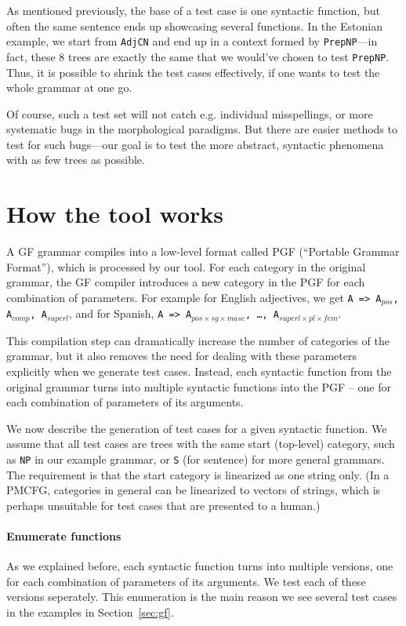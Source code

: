 \documentclass[11pt]{article}
\def\t#1{\texttt{#1}}
\begin{document}
As mentioned previously, the base of a test case is one syntactic
function, but often the same sentence ends up showcasing several
functions. In the Estonian example, we start from \t{AdjCN} 
and end up in a context formed by \t{PrepNP}---in fact, these 8 trees
are exactly the same that we would've chosen to test \t{PrepNP}. Thus,
it is possible to shrink the test cases effectively, if one wants to
test the whole grammar at one go.

Of course, such a test set will not catch e.g. individual
misspellings, or more systematic bugs in the morphological
paradigms. But there are easier methods to test for such bugs---our 
goal is to test the more abstract, syntactic phenomena with as few
trees as possible.  

\section{How the tool works}
\label{sec:details}

A GF grammar compiles into a low-level format called PGF (``Portable Grammar Format''), which is processed by our tool. For each category in the original grammar, the GF compiler introduces a new category in the PGF for each combination of parameters. For example for English adjectives, we get \texttt{A => A$_{pos}$, A$_{comp}$,
A$_{superl}$}, and for Spanish, \texttt{A => A$_{pos\times{}sg\times{}masc}$, \dots, A$_{superl\times{}pl\times{}fem}$}. 

This compilation step can dramatically increase the number of categories of the grammar, but it also removes the need for dealing with these parameters explicitly when we generate test cases. Instead, each syntactic function from the original grammar turns into multiple syntactic functions into the PGF -- one for each combination of parameters of its arguments.

We now describe the generation of test cases for a given syntactic function. We assume that all test cases are trees with the same start (top-level) category, such as \t{NP} in our example grammar, or \t{S} (for sentence) for more general grammars. The requirement is that the start category is linearized as one string only. (In a PMCFG, categories in general can be linearized to vectors of strings, which is perhaps unsuitable for test cases that are presented to a human.)

\paragraph{Enumerate functions} As we explained before, each syntactic function turns into multiple versions, one for each combination of parameters of its arguments. We test each of these versions seperately. This enumeration is the main reason we see several test cases in the examples in Section~\ref{sec:gf}.
\end{document}
